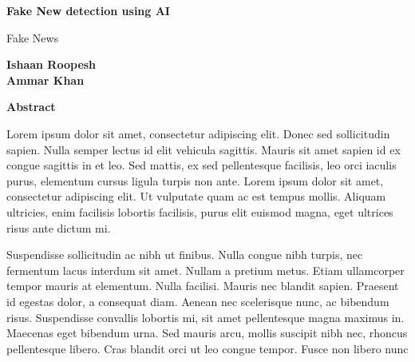 \documentclass[10pt, a4paper]{article}
\begin{document}
    \begin{center}
        \Large
        \textbf{Fake New detection using AI}

        \vspace{0.4cm}
        \large
        Fake News

        \vspace{0.4cm}
        \textbf{Ishaan Roopesh\\Ammar Khan}

        \vspace{0.9cm}
        \textbf{Abstract}
    \end{center}

    Lorem ipsum dolor sit amet, consectetur adipiscing elit. Donec sed sollicitudin sapien. Nulla
    semper lectus id elit vehicula sagittis. Mauris sit amet sapien id ex congue sagittis in et leo. Sed
    mattis, ex sed pellentesque facilisis, leo orci iaculis purus, elementum cursus ligula turpis non ante.
    Lorem ipsum dolor sit amet, consectetur adipiscing elit. Ut vulputate quam ac est tempus mollis.
    Aliquam ultricies, enim facilisis lobortis facilisis, purus elit euismod magna, eget ultrices risus ante
    dictum mi.

    Suspendisse sollicitudin ac nibh ut finibus. Nulla congue nibh turpis, nec fermentum lacus interdum
    sit amet. Nullam a pretium metus. Etiam ullamcorper tempor mauris at elementum. Nulla facilisi.
    Mauris nec blandit sapien. Praesent id egestas dolor, a consequat diam. Aenean nec scelerisque
    nunc, ac bibendum risus. Suspendisse convallis lobortis mi, sit amet pellentesque magna maximus
    in. Maecenas eget bibendum urna. Sed mauris arcu, mollis suscipit nibh nec, rhoncus pellentesque
    libero. Cras blandit orci ut leo congue tempor. Fusce non libero nunc
\end{document}
